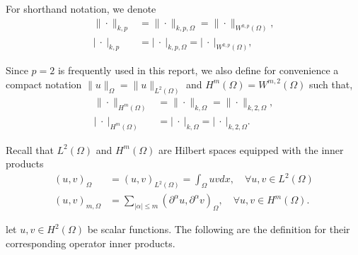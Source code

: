 \documentclass[11pt]{article}
\theoremstyle{remark}
\newcommand{\abs}[1]{\left\lvert #1 \right\rvert}
\renewcommand{\le}{\leqslant}
\numberwithin{equation}{section}
\begin{document}
For shorthand notation, we denote
\begin{equation}
    \begin{split}
\| \cdot \|_{k,p}^{  } & = \| \cdot  \|_{k,p,\Omega   }^{  } = \| \cdot  \|_{ W^{k,p}( \Omega )   }^{  }, \\
   \abs{ \  \cdot \ }_{k,p}^{  } &= \abs{ \   \cdot \ }_{k,p,\Omega   }^{  } = \abs{ \  \cdot \ }_{ W^{k,p}( \Omega )   }^{  },
    \end{split}
\end{equation}

Since $p=2$ is frequently used in this report, we also define for convenience a compact notation $\| u \|_{ \Omega  }^{  }  = \| u \|_{ L^{2}\left( \Omega  \right)  }^{  } $ and $H^{m}( \Omega ) = W^{m,2}( \Omega )  $ such that,
\begin{equation}
\begin{split}
\| \cdot  \|_{H^{m}( \Omega )   }^{  } & = \|   \cdot  \|_{k,\Omega   }^{  } = \|   \cdot  \|_{k,2,\Omega   }^{  },  \\
\abs{ \   \cdot \  }_{H^{m}( \Omega )   }^{  } & = \abs{ \   \cdot \  } _{k,\Omega   }^{  } =  \abs{ \ \cdot \   } _{k,2,\Omega   }^{  }.
\end{split}
\end{equation}

Recall that $L^{2}( \Omega ) $ and $H^{m}( \Omega ) $ are Hilbert spaces equipped with the inner products
\begin{equation}
    \begin{split}
\left( u,v \right) _{\Omega } & = \left( u,v \right) _{L^2\left( \Omega  \right) } = \int_{\Omega }^{} u  v dx, \quad \forall u,v \in L^{2}( \Omega )  \\
    \left( u,v \right) _{m,\Omega } & = \sum_{\left\lvert \alpha  \right\rvert  \le  m}^{}  ( \partial ^{\alpha } u ,  \partial ^{\alpha } v )_{\Omega }, \quad  \forall u,v \in H^{m}( \Omega  ).
    \end{split}
\end{equation}

 let $u,v \in H^{2}(\Omega)$ be scalar functions. The following are the definition for their corresponding operator inner products.
\end{document}
